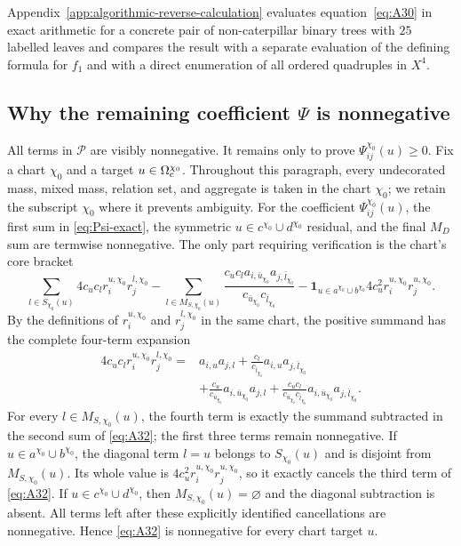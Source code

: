 \documentclass[11pt]{article}
\begin{document}
Appendix~\ref{app:algorithmic-reverse-calculation} evaluates
equation~\eqref{eq:A30} in exact arithmetic for a concrete pair of
non-caterpillar binary trees with $25$ labelled leaves and compares the result
with a separate evaluation of the defining formula for $f_1$ and with a
direct enumeration of all ordered quadruples in $X^4$.

\subsection[Nonnegativity of the remaining coefficient]
{Why the remaining coefficient $\Psi$ is nonnegative}

All terms in $\mathcal P$ are visibly nonnegative.  It remains only to prove
$\Psi_{ij}^{\chi_0}(u)\ge0$.  Fix a chart $\chi_0$ and a
target $u\in\Omega_{\rm c}^{\chi_0}$.  Throughout this paragraph, every
undecorated mass, mixed mass, relation set, and aggregate is taken in the
chart $\chi_0$; we retain the subscript $\chi_0$ where it prevents ambiguity.
For the coefficient $\Psi^{\chi_0}_{ij}(u)$, the first sum in
\eqref{eq:Psi-exact}, the symmetric $u\in c^{\chi_0}\cup d^{\chi_0}$
residual, and the final $M_D$ sum are termwise nonnegative.  The only part
requiring verification is the chart's core bracket
\begin{equation}\label{eq:A32}
\sum_{l\in S_{\chi_0}(u)}4c_uc_l r_i^{u,\chi_0} r_j^{l,\chi_0}
-\sum_{l\in M_{S,\chi_0}(u)}
\frac{c_uc_l a_{i,\bar u_{\chi_0}}a_{j,\bar l_{\chi_0}}}
{c_{\bar u_{\chi_0}}c_{\bar l_{\chi_0}}}
-\mathbf 1_{u\in a^{\chi_0}\cup b^{\chi_0}}
4c_u^{2}r_i^{u,\chi_0}r_j^{u,\chi_0}.
\tag{A.32}
\end{equation}
By the definitions of $r_i^{u,\chi_0}$ and $r_j^{l,\chi_0}$ in the same chart,
the positive summand has the complete four-term expansion
\[
\begin{aligned}
4c_uc_l r_i^{u,\chi_0}r_j^{l,\chi_0}
={}&a_{i,u}a_{j,l}
+\frac{c_l}{c_{\bar l_{\chi_0}}}a_{i,u}a_{j,\bar l_{\chi_0}}\\
&+\frac{c_u}{c_{\bar u_{\chi_0}}}a_{i,\bar u_{\chi_0}}a_{j,l}
+\frac{c_uc_l}{c_{\bar u_{\chi_0}}c_{\bar l_{\chi_0}}}
a_{i,\bar u_{\chi_0}}a_{j,\bar l_{\chi_0}}.
\end{aligned}
\]
For every $l\in M_{S,\chi_0}(u)$, the fourth term is exactly the summand
subtracted in the second sum of \eqref{eq:A32}; the first three terms remain
nonnegative.  If $u\in a^{\chi_0}\cup b^{\chi_0}$, the diagonal term $l=u$
belongs to $S_{\chi_0}(u)$ and is disjoint from $M_{S,\chi_0}(u)$.  Its whole
value is $4c_u^2r_i^{u,\chi_0}r_j^{u,\chi_0}$, so it exactly cancels the third
term of \eqref{eq:A32}.  If $u\in c^{\chi_0}\cup d^{\chi_0}$, then
$M_{S,\chi_0}(u)=\varnothing$ and the diagonal subtraction is absent.  All
terms left after these explicitly identified cancellations are nonnegative.
Hence \eqref{eq:A32} is nonnegative for every chart target $u$.
\end{document}
